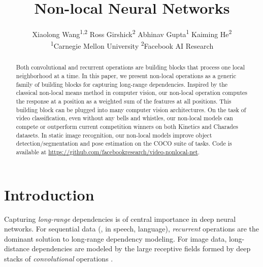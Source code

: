 \documentclass[10pt,twocolumn,letterpaper]{article}
\begin{document}
\title{Non-local Neural Networks \vspace{-.5em}}

\author{
Xiaolong Wang\textsuperscript{1,2}\footnotemark \qquad
Ross Girshick\textsuperscript{2} \qquad
Abhinav Gupta\textsuperscript{1} \qquad
Kaiming He\textsuperscript{2} \vspace{.3em}\\
\textsuperscript{1}Carnegie Mellon University \qquad\qquad \textsuperscript{2}Facebook AI Research
\vspace{-.6em}
}

\maketitle
\renewcommand*{\thefootnote}{\fnsymbol{footnote}}
\setcounter{footnote}{1}
\renewcommand*{\thefootnote}{\arabic{footnote}}
\setcounter{footnote}{0}


\begin{abstract}
\vspace{-.5em}
Both convolutional and recurrent operations are building blocks that process one local neighborhood at a time. In this paper, we present non-local operations as a generic family of building blocks for capturing long-range dependencies. Inspired by the classical non-local means method \cite{Buades2005} in computer vision, our non-local operation computes the response at a position as a weighted sum of the features at all positions. This building block can be plugged into many computer vision architectures. On the task of video classification, even without any bells and whistles, our non-local models can compete or outperform current competition winners on both Kinetics and Charades datasets.
In static image recognition, our non-local models improve object detection/segmentation and pose estimation on the COCO suite of tasks. Code is available at \url{https://github.com/facebookresearch/video-nonlocal-net}.
\end{abstract}
\vspace{-1em}
\section{Introduction}

Capturing \emph{long-range} dependencies is of central importance in deep neural networks. For sequential data (\eg, in speech, language), \emph{recurrent} operations \cite{Rumelhart1986,Hochreiter1997} are the dominant solution to long-range dependency modeling. For image data, long-distance dependencies are modeled by the large receptive fields formed by deep stacks of \emph{convolutional} operations \cite{Fukushima1982,LeCun1989}.
\end{document}
